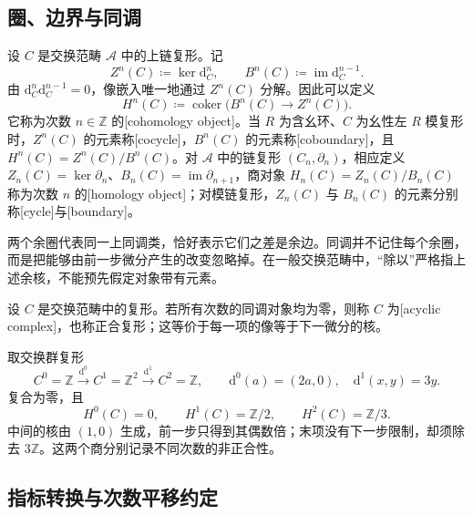 \subsection{圈、边界与同调}
\label{b4:subsec:0501:02}

\begin{definition}\label{b4:def:cohomology}
设 \(C\) 是交换范畴 \(\mathcal A\) 中的上链复形。记
\[
Z^n(C)\coloneqq\ker \mathrm{d}_C^n,\qquad
B^n(C)\coloneqq\operatorname{im}\mathrm{d}_C^{n-1}.
\]
由 \(\mathrm{d}_C^n\mathrm{d}_C^{n-1}=0\)，像嵌入唯一地通过 \(Z^n(C)\) 分解。因此可以定义
\[
H^n(C)\coloneqq\operatorname{coker}\bigl(B^n(C)\longrightarrow Z^n(C)\bigr).
\]
它称为次数 \(n\in\mathbb Z\) 的[cohomology object]。当 \(R\) 为含幺环、\(C\) 为幺性左 \(R\) 模复形时，\(Z^n(C)\) 的元素称[cocycle]，\(B^n(C)\) 的元素称[coboundary]，且 \(H^n(C)=Z^n(C)/B^n(C)\)。对 \(\mathcal A\) 中的链复形 \((C_n,\partial_n)\)，相应定义 \(Z_n(C)=\ker\partial_n\)、\(B_n(C)=\operatorname{im}\partial_{n+1}\)，商对象 \(H_n(C)=Z_n(C)/B_n(C)\) 称为次数 \(n\) 的[homology object]；对模链复形，\(Z_n(C)\) 与 \(B_n(C)\) 的元素分别称[cycle]与[boundary]。
\end{definition}

两个余圈代表同一上同调类，恰好表示它们之差是余边。同调并不记住每个余圈，而是把能够由前一步微分产生的改变忽略掉。在一般交换范畴中，“除以”严格指上述余核，不能预先假定对象带有元素。

\begin{definition}\label{b4:def:acyclic-complex}
设 \(C\) 是交换范畴中的复形。若所有次数的同调对象均为零，则称 \(C\) 为[acyclic complex]，也称正合复形；这等价于每一项的像等于下一微分的核。
\end{definition}

\begin{example}\label{b4:exm:integer-three-complex}
取交换群复形
\[
C^0=\mathbb Z\xrightarrow{\ \mathrm{d}^0\ }C^1=\mathbb Z^2
\xrightarrow{\ \mathrm{d}^1\ }C^2=\mathbb Z,
\qquad \mathrm{d}^0(a)=(2a,0),\quad \mathrm{d}^1(x,y)=3y.
\]
复合为零，且
\[
H^0(C)=0,\qquad H^1(C)=\mathbb Z/2,\qquad H^2(C)=\mathbb Z/3.
\]
中间的核由 \((1,0)\) 生成，前一步只得到其偶数倍；末项没有下一步限制，却须除去 \(3\mathbb Z\)。这两个商分别记录不同次数的非正合性。
\end{example}

\subsection{指标转换与次数平移约定}
\label{b4:subsec:0501:03}

